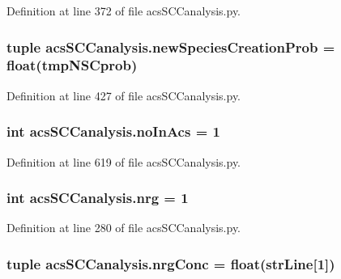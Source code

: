 Definition at line 372 of file acs\-S\-C\-Canalysis.\-py.

\hypertarget{a00097_a47b24df6e487f6dd90158dde93cc7c93}{
\subsubsection[{new\-Species\-Creation\-Prob}]{\setlength{\rightskip}{0pt plus 5cm}tuple acs\-S\-C\-Canalysis.\-new\-Species\-Creation\-Prob = float(tmp\-N\-S\-Cprob)}}\label{a00097_a47b24df6e487f6dd90158dde93cc7c93}


Definition at line 427 of file acs\-S\-C\-Canalysis.\-py.

\hypertarget{a00097_a4766b3ca835449f1aa287fda699c7f96}{
\subsubsection[{no\-In\-Acs}]{\setlength{\rightskip}{0pt plus 5cm}int acs\-S\-C\-Canalysis.\-no\-In\-Acs = 1}}\label{a00097_a4766b3ca835449f1aa287fda699c7f96}


Definition at line 619 of file acs\-S\-C\-Canalysis.\-py.

\hypertarget{a00097_a948683f966c62ac856582281c3cda1f4}{
\subsubsection[{nrg}]{\setlength{\rightskip}{0pt plus 5cm}int acs\-S\-C\-Canalysis.\-nrg = 1}}\label{a00097_a948683f966c62ac856582281c3cda1f4}


Definition at line 280 of file acs\-S\-C\-Canalysis.\-py.

\hypertarget{a00097_a24d5f5a61d56c596017396ad272ef4a4}{
\subsubsection[{nrg\-Conc}]{\setlength{\rightskip}{0pt plus 5cm}tuple acs\-S\-C\-Canalysis.\-nrg\-Conc = float({\bf str\-Line}\mbox{[}1\mbox{]})}}\label{a00097_a24d5f5a61d56c596017396ad272ef4a4}


